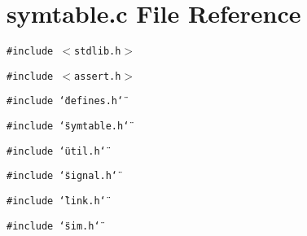 \section{symtable.c File Reference}
\label{symtable_8c}
{\tt \#include $<$stdlib.h$>$}\par
{\tt \#include $<$assert.h$>$}\par
{\tt \#include \char`\"{}defines.h\char`\"{}}\par
{\tt \#include \char`\"{}symtable.h\char`\"{}}\par
{\tt \#include \char`\"{}util.h\char`\"{}}\par
{\tt \#include \char`\"{}signal.h\char`\"{}}\par
{\tt \#include \char`\"{}link.h\char`\"{}}\par
{\tt \#include \char`\"{}sim.h\char`\"{}}\par
